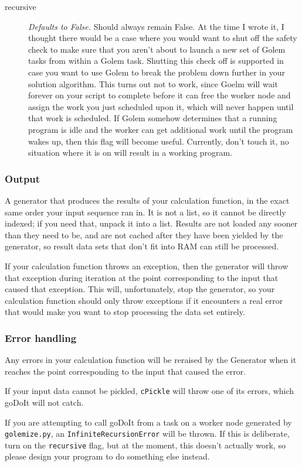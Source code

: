 \documentclass[11pt,ebook,oneside,final]{memoir} %
\begin{document}
\begin{description}
	\item[recursive] \textit{Defaults to False.} Should always remain False. At the time I wrote it, I thought there would be a case where you would want to shut off the safety check to make sure that you aren't about to launch a new set of Golem tasks from within a Golem task. Shutting this check off is supported in case you want to use Golem to break the problem down further in your solution algorithm. This turns out not to work, since Goelm will wait forever on your script to complete before it can free the worker node and assign the work you just scheduled upon it, which will never happen until that work is scheduled. If Golem somehow determines that a running program is idle and the worker can get additional work until the program wakes up, then this flag will become useful. Currently, don't touch it, no situation where it is on will result in a working program.
\end{description}

\subsubsection{Output}
A generator that produces the results of your calculation function, in the exact same order your input sequence ran in. It is not a list, so it cannot be directly indexed; if you need that, unpack it into a list. Results are not loaded any sooner than they need to be, and are not cached after they have been yielded by the generator, so result data sets that don't fit into RAM can still be processed.

If your calculation function throws an exception, then the generator will throw that exception during iteration at the point corresponding to the input that caused that exception. This will, unfortunately, stop the generator, so your calculation function should only throw exceptions if it encounters a real error that would make you want to stop processing the data set entirely.
\subsubsection{Error handling}
Any errors in your calculation function will be reraised by the Generator when it reaches the point corresponding to the input that caused the error.

If your input data cannot be pickled, \texttt{cPickle} will throw one of its errors, which goDoIt will not catch.

If you are attempting to call goDoIt from a task on a worker node generated by \texttt{golemize.py}, an \texttt{InfiniteRecursionError} will be thrown. If this is deliberate, turn on the \texttt{recursive} flag, but at the moment, this doesn't actually work, so please design your program to do something else instead.
\end{document}
